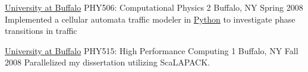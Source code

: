 

\begin{cventries}





  \cventry
    {\href{www.buffalo.edu}{University at Buffalo}}
    {PHY506: Computational Physics 2}
    {Buffalo, NY} {Spring 2008}
    {Implemented a cellular automata traffic modeler in \href{www.python.org}{Python} to investigate phase transitions in traffic}


  \cventry
    {\href{www.buffalo.edu}{University at Buffalo}}
    {PHY515: High Performance Computing 1}
    {Buffalo, NY} {Fall 2008}
    {Parallelized my dissertation utilizing ScaLAPACK.}



\end{cventries}
